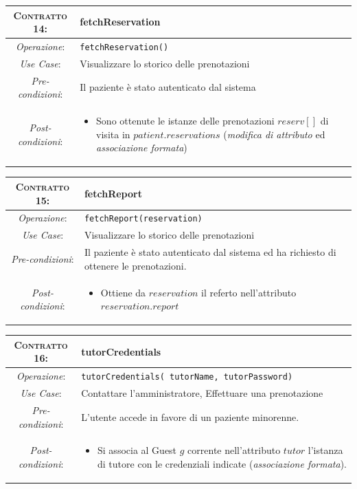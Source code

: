 \begin{tabularx}{\columnwidth}{cX}
\toprule
\textsc{Contratto 14}:& \textbf{fetchReservation}\\
\midrule
\textit{Operazione}: & 	\texttt{fetchReservation()}\\
\textit{Use Case}: &	Visualizzare lo storico delle prenotazioni\\
\textit{Pre-condizioni}: &  Il paziente è stato autenticato dal sistema\\
\textit{Post-condizioni}: & \begin{itemize}
\item Sono ottenute le istanze delle prenotazioni $reserv[]$ di visita in 
	$patient.reservations$ (\textit{modifica di attributo} ed \textit{associazione
	formata})
\end{itemize}\\
\bottomrule
\end{tabularx}
\medskip

\begin{tabularx}{\columnwidth}{cX}
\toprule
\textsc{Contratto 15}:& \textbf{fetchReport}\\
\midrule
\textit{Operazione}: & 	\texttt{fetchReport(reservation)}\\
\textit{Use Case}: &	Visualizzare lo storico delle prenotazioni\\
\textit{Pre-condizioni}: &  Il paziente è stato autenticato dal sistema ed ha richiesto
di ottenere le prenotazioni.\\
\textit{Post-condizioni}: & \begin{itemize}
\item Ottiene da $reservation$ il referto nell'attributo $reservation.report$
\end{itemize}\\
\bottomrule
\end{tabularx}
\medskip


\begin{tabularx}{\columnwidth}{cX}
\toprule
\textsc{Contratto 16}:& \textbf{tutorCredentials}\\
\midrule
\textit{Operazione}: & 	\texttt{tutorCredentials( tutorName, tutorPassword)}\\
\textit{Use Case}: &	Contattare l’amministratore, Effettuare una prenotazione\\
\textit{Pre-condizioni}: &  L'utente accede in favore di un paziente minorenne.\\
\textit{Post-condizioni}: & \begin{itemize}
\item Si associa al Guest $g$ corrente nell'attributo $tutor$ l'istanza di tutore
	con le credenziali indicate (\textit{associazione formata}).
\end{itemize}\\
\bottomrule
\end{tabularx}
\medskip

